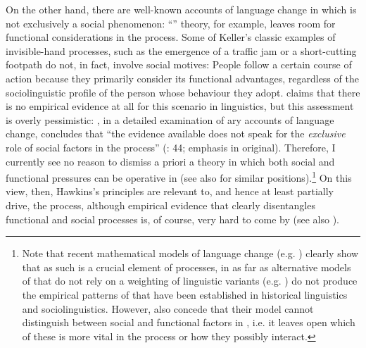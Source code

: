 \documentclass[output=paper]{langsci/langscibook}
\begin{document}
On the other hand, there are well-known accounts of language change in which  is not exclusively a social phenomenon:  “” theory, for example, leaves room for functional considerations in the  process. Some of Keller’s classic examples of invisible-hand processes, such as the emergence of a traffic jam or a short-cutting footpath do not, in fact, involve social motives: People follow a certain course of action because they primarily consider its functional advantages, regardless of the sociolinguistic profile of the person whose behaviour they adopt. \citet{Cristofaro2017_Dep} claims that there is no empirical evidence at all for this scenario in linguistics, but this assessment is overly pessimistic: \citet{Rosenbach2008_Change}, in a detailed examination of ary accounts of language change, concludes that “the evidence available does not speak for the \textit{exclusive} role of social factors in the  process” (\citealt{Rosenbach2008_Change}: 44; emphasis in original). Therefore, I currently see no reason to dismiss a priori a theory in which both social and functional  pressures can be operative in  (see also \citealt{Haspelmath1999_Opt,Nettle1999_Div,Enfield2014_Caus} for similar positions).\footnote{Note that recent mathematical models of language change (e.g. \citealt{BlytheCroft2012}) clearly show that  as such is a crucial element of  processes, in as far as alternative models of  that do not rely on a weighting of linguistic variants (e.g. \citealt{Trudgill2004_Dial}) do not produce the empirical patterns of  that have been established in historical linguistics and sociolinguistics. However, \citet{BlytheCroft2012} also concede that their model cannot distinguish between social and functional factors in , i.e. it leaves open which of these is more vital in the  process or how they possibly interact.} On this view, then, Hawkins’s  principles are relevant to, and hence at least partially drive, the  process, although empirical evidence that clearly disentangles functional and social  processes is, of course, very hard to come by (see also \citealt{Seiler2006_Func}). 
\end{document}
